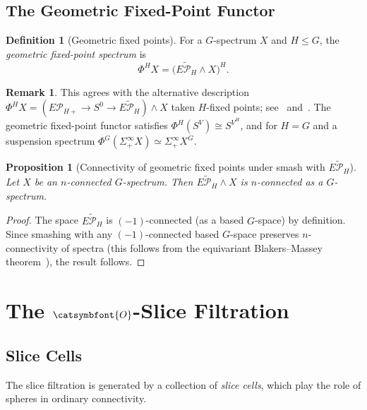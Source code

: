 \documentclass[12pt]{article}
\newcommand{\aO}{{\catsymbfont{O}}}
\newtheorem{proposition}[theorem]{Proposition}
\theoremstyle{definition}
\newtheorem{definition}[theorem]{Definition}
\newtheorem{remark}[theorem]{Remark}
\begin{document}
\subsection{The Geometric Fixed-Point Functor}

\begin{definition}[Geometric fixed points]\label{def:gfp}
For a $G$-spectrum $X$ and $H\leq G$, the \emph{geometric fixed-point spectrum} is
\[
   \Phi^H X = \bigl(\widetilde{E\mathcal{P}_H} \wedge X\bigr)^H.
\]
\end{definition}

\begin{remark}
This agrees with the alternative description $\Phi^H X = (E\mathcal{P}_{H+} \to S^0 \to \widetilde{E\mathcal{P}_H}) \wedge X$ taken $H$-fixed points; see~\cite[Def.~B.3]{HHR} and~\cite[XVI.6]{LMS}.  The geometric fixed-point functor satisfies $\Phi^H(S^V) \cong S^{V^H}$, and for $H=G$ and a suspension spectrum $\Phi^G(\Sigma^\infty_+ X) \simeq \Sigma^\infty_+ X^G$.
\end{remark}

\begin{proposition}[Connectivity of geometric fixed points under smash with $\widetilde{E\mathcal{P}_H}$]\label{prop:EPH-smash}
Let $X$ be an $n$-connected $G$-spectrum.  Then $\widetilde{E\mathcal{P}_H} \wedge X$ is $n$-connected as a $G$-spectrum.
\end{proposition}
\begin{proof}
The space $\widetilde{E\mathcal{P}_H}$ is $(-1)$-connected (as a based $G$-space) by definition.  Since smashing with any $(-1)$-connected based $G$-space preserves $n$-connectivity of spectra (this follows from the equivariant Blakers--Massey theorem~\cite[XIII.1]{LMS}), the result follows.
\end{proof}

\section{The $\aO$-Slice Filtration}\label{sec:slice}

\subsection{Slice Cells}

The slice filtration is generated by a collection of \emph{slice cells}, which play the role of spheres in ordinary connectivity.
\end{document}
